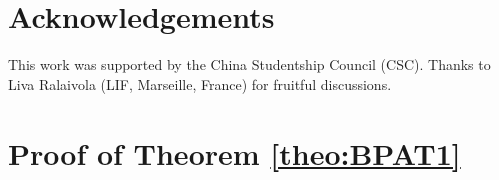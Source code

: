 \documentclass[preprint,12pt,authoryear]{elsarticle}
\begin{document}







\section*{Acknowledgements}

This work was supported by the China Studentship Council (CSC). Thanks to Liva Ralaivola (LIF, Marseille, France) for fruitful discussions.

\appendix
\section{Proof of Theorem \ref{theo:BPAT1}}\label{app:thm1}
\end{document}
